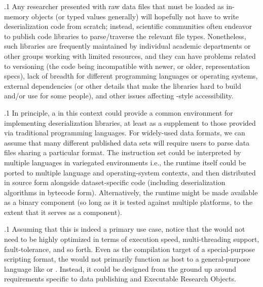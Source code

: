 \documentclass[11pt, twocolumn]{article}
\begin{document}
\p.1{%
Any researcher presented with raw data files that must be loaded as in-memory objects
(or typed values generally) will hopefully not have to write deserialization code
from scratch; instead, scientific communities often endeavor to publish
code libraries to parse/traverse the relevant file types. Nonetheless, such
libraries are frequently maintained by individual academic departments or other
groups working with limited resources, and they can have problems related
to versioning (the code being incompatible with newer, or older, representation specs),
lack of breadth for different programming languages or operating systems,
external dependencies (or other details that make the libraries hard to build and/or
use for some people), and other issues affecting -style accessibility.
}%

\p.1{%
In principle, a  in this context could provide a common environment for
implementing deserialization libraries, at least as a supplement to those
provided via traditional programming languages. For widely-used
data formats, we can assume that many different published data sets
will require users to parse data files sharing a particular format.
The  instruction set could be interpreted by
multiple languages in variegated environments \mdash{} i.e., the  runtime itself
could be ported to multiple language and operating-system contexts,
and then distributed in source form alongside dataset-specific code
(including deserialization algorithms in bytecode form). Alternatively, the
 runtime might be made available as a binary component (so long as it is
tested against multiple platforms, to the extent that it serves as a
 component).
}%

\p.1{%
Assuming that this is indeed a primary use case, notice that the  would not
need to be highly optimized in terms of execution speed, multi-threading support,
fault-tolerance, and so forth. Even as the compilation target of a special-purpose
scripting format, the  would not primarily function as host to a
general-purpose language like  or . Instead, it could be designed
from the ground up around requirements specific to data publishing and
Executable Research Objects.
}%
\end{document}
